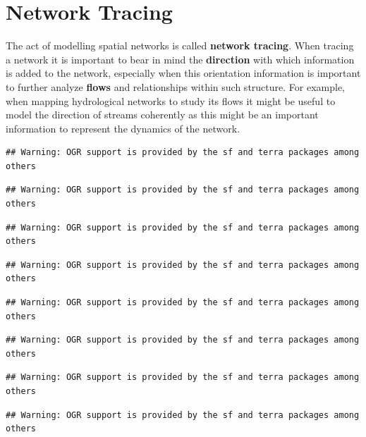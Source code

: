 \documentclass[
]{book}
\begin{document}
\hypertarget{network-tracing}{%
\section{Network Tracing}\label{network-tracing}}

The act of modelling spatial networks is called \textbf{network tracing}. When tracing a network it is important to bear in mind the \textbf{direction} with which information is added to the network, especially when this orientation information is important to further analyze \textbf{flows} and relationships within such structure. For example, when mapping hydrological networks to study its flows it might be useful to model the direction of streams coherently as this might be an important information to represent the dynamics of the network.

\begin{verbatim}
## Warning: OGR support is provided by the sf and terra packages among others
\end{verbatim}

\begin{verbatim}
## Warning: OGR support is provided by the sf and terra packages among others
\end{verbatim}

\begin{verbatim}
## Warning: OGR support is provided by the sf and terra packages among others
\end{verbatim}

\begin{verbatim}
## Warning: OGR support is provided by the sf and terra packages among others
\end{verbatim}

\begin{verbatim}
## Warning: OGR support is provided by the sf and terra packages among others
\end{verbatim}

\begin{verbatim}
## Warning: OGR support is provided by the sf and terra packages among others
\end{verbatim}

\begin{verbatim}
## Warning: OGR support is provided by the sf and terra packages among others
\end{verbatim}

\begin{verbatim}
## Warning: OGR support is provided by the sf and terra packages among others
\end{verbatim}
\end{document}
